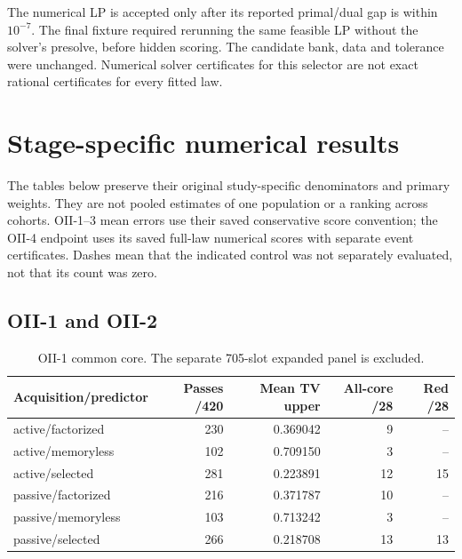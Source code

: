 The numerical LP is accepted only after its reported primal/dual gap is within $10^{-7}$. The final fixture required rerunning the same feasible LP without the solver's presolve, before hidden scoring. The candidate bank, data and tolerance were unchanged. Numerical solver certificates for this selector are not exact rational certificates for every fitted law.


\FloatBarrier

\section{Stage-specific numerical results}\label{app:results}
The tables below preserve their original study-specific denominators and primary weights. They are not pooled estimates of one population or a ranking across cohorts. OII-1--3 mean errors use their saved conservative score convention; the OII-4 endpoint uses its saved full-law numerical scores with separate event certificates. Dashes mean that the indicated control was not separately evaluated, not that its count was zero.

\subsection{OII-1 and OII-2}

\begin{table}[tbp]
\centering
\caption{OII-1 common core. The separate 705-slot expanded panel is excluded.}\label{tab:oii1}
\small
\setlength{\tabcolsep}{5pt}
\begin{tabular}{lrrrr}
\toprule
Acquisition/predictor & Passes /420 & Mean TV upper & All-core /28 & Red /28 \\
\midrule
active/factorized & 230 & 0.369042 & 9 & -- \\
active/memoryless & 102 & 0.709150 & 3 & -- \\
active/selected & 281 & 0.223891 & 12 & 15 \\
passive/factorized & 216 & 0.371787 & 10 & -- \\
passive/memoryless & 103 & 0.713242 & 3 & -- \\
passive/selected & 266 & 0.218708 & 13 & 13 \\
\bottomrule
\end{tabular}
\end{table}

